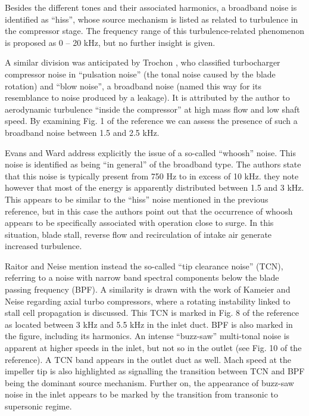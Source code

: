 Besides the different tones and their associated harmonics, a broadband noise is identified as ``hiss'', whose source mechanism is listed as related to turbulence in the compressor stage. The frequency range of this turbulence-related phenomenon is proposed as 0 -- 20 kHz, but no further insight is given.

A similar division was anticipated by Trochon \cite{trochon2001new}, who classified turbocharger compressor noise in ``pulsation noise'' (the tonal noise caused by the blade rotation) and ``blow noise'', a broadband noise (named this way for its resemblance to noise produced by a leakage). It is attributed by the author to aerodynamic turbulence ``inside the compressor'' at high mass flow and low shaft speed. By examining Fig. 1 of the reference we can assess the presence of such a broadband noise between 1.5 and 2.5 kHz.

Evans and Ward \cite{evans2005minimizing} address explicitly the issue of a so-called ``whoosh'' noise. This noise is identified as being ``in general'' of the broadband type. The authors state that this noise is typically present from 750 Hz to in excess of 10 kHz. they note however that most of the energy is apparently distributed between 1.5 and 3 kHz. This appears to be similar to the ``hiss'' noise mentioned in the previous reference, but in this case the authors point out that the occurrence of whoosh appears to be specifically associated with operation close to surge. In this situation, blade stall, reverse flow and recirculation of intake air generate increased turbulence.

Raitor and Neise \cite{raitor2008sound} mention instead the so-called ``tip clearance noise'' (TCN), referring to a noise with narrow band spectral components below the blade passing frequency (BPF). A similarity is drawn with the work of Kameier and Neise \cite{kameier1997rotating} regarding axial turbo compressors, where a rotating instability linked to stall cell propagation is discussed. This TCN is marked in Fig. 8 of the reference as located between 3 kHz and 5.5 kHz in the inlet duct. BPF is also marked in the figure, including its harmonics. An intense ``buzz-saw'' multi-tonal noise is apparent at higher speeds in the inlet, but not so in the outlet (see Fig. 10 of the reference). A TCN band appears in the outlet duct as well. Mach speed at the impeller tip is also highlighted as signalling the transition between TCN and BPF being the dominant source mechanism.  Further on, the appearance of buzz-saw noise in the inlet appears to be marked by the transition from transonic to supersonic regime.

